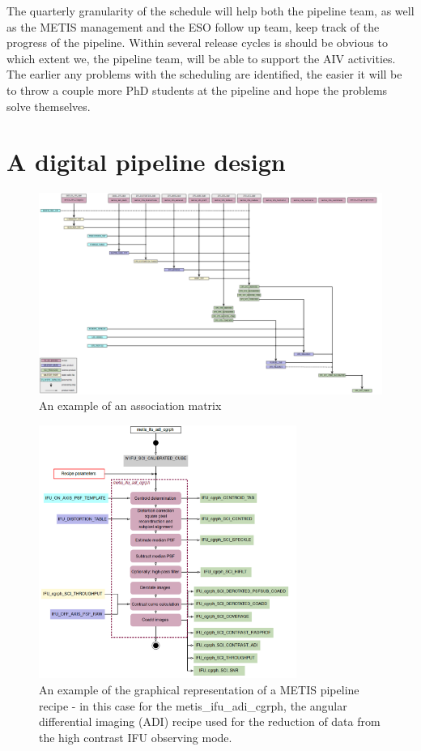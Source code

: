 \documentclass[a4paper]{spie}  %
\begin{document}
The quarterly granularity of the schedule will help both the pipeline team, as well as the METIS management and the ESO follow up team, keep track of the progress of the pipeline. 
Within several release cycles is should be obvious to which extent we, the pipeline team, will be able to support the AIV activities.
The earlier any problems with the scheduling are identified, the easier it will be to throw a couple more PhD students at the pipeline and hope the problems solve themselves.

\section{A digital pipeline design}
\label{sec:pip}

\begin{figure}
    \centering
    \includegraphics[width=\textwidth]{SPIE_paper/figures/metis_ifu_assoc.png}
    \caption{An example of an association matrix }
    \label{fig:assoc_mat_example}
\end{figure}

\begin{figure}
    \centering
    \includegraphics[width=0.75\textwidth]{SPIE_paper/figures/metis_ifu_adi_cgrph_recipe.png}
    \caption{An example of the graphical representation of a METIS pipeline recipe - in this case for the metis\_ifu\_adi\_cgrph, the angular differential imaging (ADI) recipe used for the reduction of data from the high contrast IFU observing mode.}
    \label{fig:recipe_example}
\end{figure}
\end{document}
